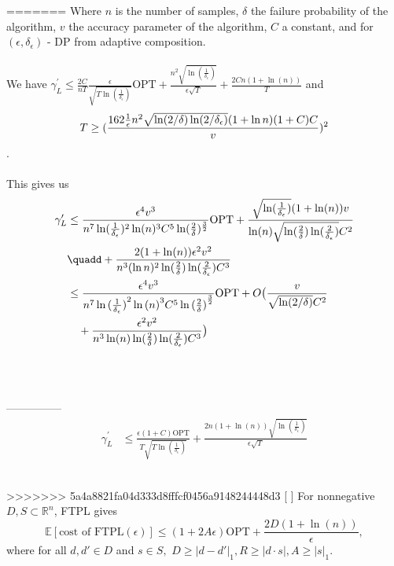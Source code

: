 \begin{theorem}
	

	
=======
Where $n$ is the number of samples, $\delta$ the failure probability of the algorithm,
$v$ the accuracy parameter of the algorithm, $C$ a constant, and for $(\epsilon, \delta_\epsilon)$ - DP from adaptive composition.
\\ \\
\newpage
We have $\gamma_L^\prime \leq \frac{2C}{nT}
\frac{\epsilon}
{\sqrt{T\ln{(
\frac{1}{\delta_{\epsilon}}
)}}} \text{OPT}
+
\frac{n^2
\sqrt{\ln{(\frac{1}{\delta_\epsilon})}}
}{\epsilon\sqrt{T}}
+
\frac{2Cn(1+\ln{(n)})}{T}$
%
%
and $$T \geq (\frac{162\frac{1}{\epsilon}n^2 \sqrt{\ln(2/\delta) \ln(2/\delta_\epsilon)}(1+\ln n)(1+C)C}{v})^2$$.
%
\\ \\
This gives us
%
\begin{align*}
    \gamma_L^\prime &\leq \frac{\epsilon^4 v^3}{ n^7 \ln(\frac{1}{\delta_\epsilon})^2 \ln(n)^3 C^5 \ln(\frac{2}{\delta})^{\frac{3}{2}} } \text{OPT}
    +
    \frac{ \sqrt{\ln(\frac{1}{\delta_\epsilon})} (1 + \ln(n)) v }
    { \ln(n) \sqrt{ \ln(\frac{2}{\delta}) \ln(\frac{2}{\delta_\epsilon})} C^2 } \\
    & \quadd +
    \frac{ 2(1 + \ln(n)) \epsilon^2 v^2 }
    { n^3 (\ln n)^2 \ln(\frac{2}{\delta}) \ln(\frac{2}{\delta_\epsilon}) C^3 }
    \\
    &\leq
    \frac{\epsilon^4 v^3}{ n^7 \ln{(\frac{1}{\delta_\epsilon})}^2 \ln{(n)}^3 C^5 \ln{(\frac{2}{\delta})}^{\frac{3}{2}} } \text{OPT}
    +
    O \big(
    \frac{v}{\sqrt{\ln(2/\delta)}C^2}
    \\
    &\quad +
    \frac{ \epsilon^2 v^2 }
    { n^3 \ln (n) \ln(\frac{2}{\delta}) \ln(\frac{2}{\delta_\epsilon}) C^3 } \big)
\end{align*}
%
%
\\ \\ \\
---------------
\begin{align*}
  \gamma_L^\prime &\leq \frac{\epsilon(1+C)\text{OPT}}
  {T\sqrt{T\ln(\frac{1}{\delta_\epsilon})}} +
  \frac{2n(1+\ln(n))\sqrt{\ln(\frac{1}{\delta_\epsilon})}}{\epsilon\sqrt{T}}
\end{align*}
\\

\begin{theorem}
>>>>>>> 5a4a8821fa04d333d8fffcf0456a9148244448d3
  [  ] For nonnegative $D, S \subset \mathbb{R}^n$, FTPL gives
  \[ \mathbb{E}[\text{cost of FTPL}(\epsilon)] \leq
  (1 + 2A \epsilon) \text{OPT} + \frac{2D(1 + \ln(n))}{\epsilon }, \]
  where for all $d, d' \in D$ and $s \in S,$
  $D \geq |d - d'|_1, R \geq |d \cdot s|, A \geq |s|_1$.
\end{theorem}


\end{theorem}
